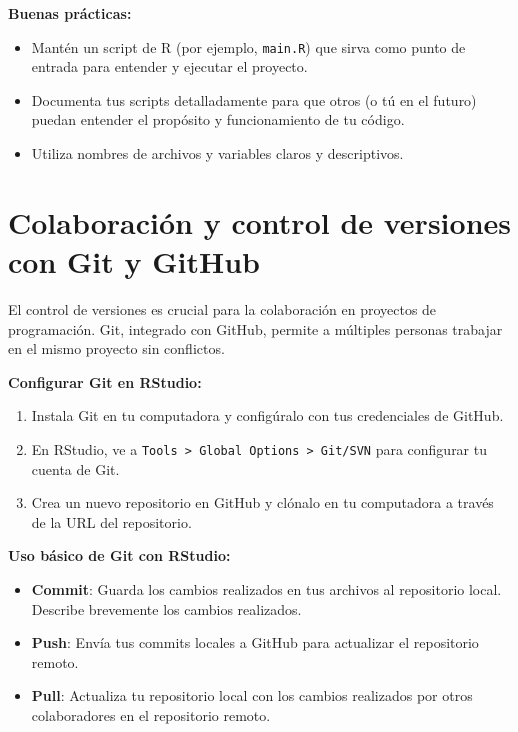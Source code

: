\documentclass[
]{book}
\providecommand{\tightlist}{%
  \setlength{\itemsep}{0pt}\setlength{\parskip}{0pt}}
\begin{document}
\textbf{Buenas prácticas:}

\begin{itemize}
\tightlist
\item
  Mantén un script de R (por ejemplo, \texttt{main.R}) que sirva como punto de entrada para entender y ejecutar el proyecto.
\item
  Documenta tus scripts detalladamente para que otros (o tú en el futuro) puedan entender el propósito y funcionamiento de tu código.
\item
  Utiliza nombres de archivos y variables claros y descriptivos.
\end{itemize}

\hypertarget{colaboraciuxf3n-y-control-de-versiones-con-git-y-github}{%
\section{Colaboración y control de versiones con Git y GitHub}\label{colaboraciuxf3n-y-control-de-versiones-con-git-y-github}}

El control de versiones es crucial para la colaboración en proyectos de programación. Git, integrado con GitHub, permite a múltiples personas trabajar en el mismo proyecto sin conflictos.

\textbf{Configurar Git en RStudio:}

\begin{enumerate}
\def\labelenumi{\arabic{enumi}.}
\tightlist
\item
  Instala Git en tu computadora y configúralo con tus credenciales de GitHub.
\item
  En RStudio, ve a \texttt{Tools\ \textgreater{}\ Global\ Options\ \textgreater{}\ Git/SVN} para configurar tu cuenta de Git.
\item
  Crea un nuevo repositorio en GitHub y clónalo en tu computadora a través de la URL del repositorio.
\end{enumerate}

\textbf{Uso básico de Git con RStudio:}

\begin{itemize}
\tightlist
\item
  \textbf{Commit}: Guarda los cambios realizados en tus archivos al repositorio local. Describe brevemente los cambios realizados.
\item
  \textbf{Push}: Envía tus commits locales a GitHub para actualizar el repositorio remoto.
\item
  \textbf{Pull}: Actualiza tu repositorio local con los cambios realizados por otros colaboradores en el repositorio remoto.
\end{itemize}
\end{document}

